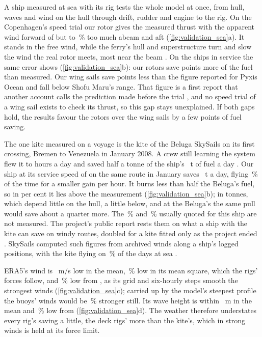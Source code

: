 A ship measured at sea with its rig tests the whole model at once, from hull, waves and wind on the hull through drift, rudder and engine to the rig. On the Copenhagen's speed trial our rotor gives the measured thrust with the apparent wind forward of  but \NumCopenhagenThrustBeam{} to \NumCopenhagenThrustAft\,\% too much abeam and aft (\cref{fig:validation_sea}a). It stands in the free wind, while the ferry's hull and superstructure turn and slow the wind the real rotor meets, most near the beam \citep{werner2023copenhagen}. On the ships in service the same error shows (\cref{fig:validation_sea}b): our rotors save \NumMeasuredRotorGap{} points more of the fuel than measured. Our wing sails save \NumMeasuredPyxisGap{} points less than the figure reported for Pyxis Ocean and fall below Shofu Maru's range. That figure is a first report that another account calls the prediction made before the trial \citep{maritimeexec2024pyxis}, and no speed trial of a wing sail exists to check its thrust, so this gap stays unexplained. If both gaps hold, the results favour the rotors over the wing sails by a few points of fuel saving.

The one kite measured on a voyage is the  kite of the  Beluga SkySails on its first crossing, Bremen to Venezuela in January 2008. A crew still learning the system flew it  to  hours a day and saved half a tonne of the ship's ~t of fuel a day \citep{verkehrsrundschau2008beluga}. Our  ship at its service speed of  on the same route in January saves \NumBelugaTonnes~t a day, flying \NumBelugaFlightShare\,\% of the time for a smaller gain per hour. It burns less than half the Beluga's fuel, so in per cent it lies above the measurement (\cref{fig:validation_sea}b); in tonnes, which depend little on the hull, a little below, and at the Beluga's  the same pull would save about a quarter more. The \,\% and \,\% usually quoted for this ship \citep{wintecc2009_record} are not measured. The project's public report rests them on what a ship with the kite can save on windy routes, doubled for a kite fitted only as the project ended \citep{wintecc2009}. SkySails computed such figures from archived winds along a ship's logged positions, with the kite flying on \,\% of the days at sea \citep{skysails2011performance}.

ERA5's wind is \NumEraWindBias~m/s low in the mean, \NumEraWindSquare\,\% low in its mean square, which the rigs' forces follow, and \NumEraStrongWind\,\% low from , as its  grid and six-hourly steps smooth the strongest winds (\cref{fig:validation_sea}c); carried up by the model's steepest profile the buoys' winds would be \,\% stronger still. Its wave height is within \NumEraWaveBias~m in the mean and \NumEraHighWaves\,\% low from  (\cref{fig:validation_sea}d). The weather therefore understates every rig's saving a little, the deck rigs' more than the kite's, which in strong winds is held at its force limit.

